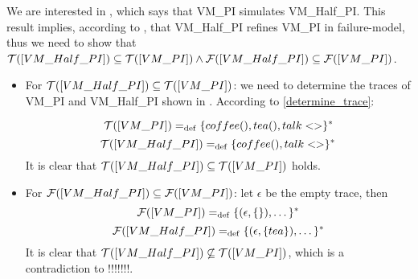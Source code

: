 We are interested in , which says that VM\_PI simulates VM\_Half\_PI. This result implies, according to , that VM\_Half\_PI refines VM\_PI in failure-model, thus we need to show that $\traces[VM\_Half\_PI]\subseteq\traces[VM\_PI] \wedge \failures[VM\_Half\_PI]\subseteq\failures[VM\_PI]$.
\begin{itemize}
\item For $\traces[VM\_Half\_PI]\subseteq\traces[VM\_PI]$: we need to determine the traces of VM\_PI and VM\_Half\_PI  shown in . According to \ref{determine_trace}:

    \[\traces[VM\_PI] \define \{coffee(),tea(),talk<>\}^\ast\]
    \[\traces[VM\_Half\_PI] \define \{coffee(),talk<>\}^\ast\]
It is clear that $\traces[VM\_Half\_PI]\subseteq\traces[VM\_PI]$ holds. 

\item For $\failures[VM\_Half\_PI]\subseteq\failures[VM\_PI]$: let $\epsilon$ be the empty trace, then
    \[\failures[VM\_PI] \define \{(\epsilon,\{\}),\dots\}^\ast\]
    \[\failures[VM\_Half\_PI] \define \{(\epsilon,\{tea\}),\dots\}^\ast\]
It is clear that $\traces[VM\_Half\_PI]\not\subseteq\traces[VM\_PI]$, which is a contradiction to  !!!!!!!. 
\end{itemize}

    